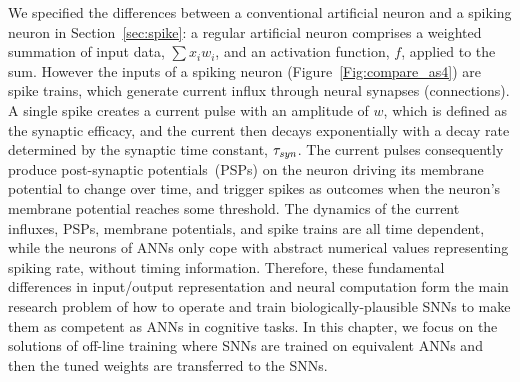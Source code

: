 	We specified the differences between a conventional artificial neuron and a spiking neuron in Section~\ref{sec:spike}: a regular artificial neuron comprises a weighted summation of input data, $\sum x_i w_i$, and an activation function, $f$, applied to the sum.
	However the inputs of a spiking neuron (Figure~\ref{Fig:compare_as4}) are spike trains, which generate current influx through neural synapses (connections).
	A single spike creates a current pulse with an amplitude of $w$, which is defined as the synaptic efficacy, and the current then decays exponentially with a decay rate determined by the synaptic time constant, $\tau_{\textit{\textrm{syn}}}$.
	The current pulses consequently produce post-synaptic potentials~(PSPs) on the neuron driving its membrane potential to change over time, and trigger spikes as outcomes when the neuron's membrane potential reaches some threshold.
	The dynamics of the current influxes, PSPs, membrane potentials, and spike trains are all time dependent, while the neurons of ANNs only cope with abstract numerical values representing spiking rate, without timing information.
	Therefore, these fundamental differences in input/output representation and neural computation form the main research problem of how to operate and train biologically-plausible SNNs to make them as competent as ANNs in cognitive tasks.
	In this chapter, we focus on the solutions of off-line training where SNNs are trained on equivalent ANNs and then the tuned weights are transferred to the SNNs.

